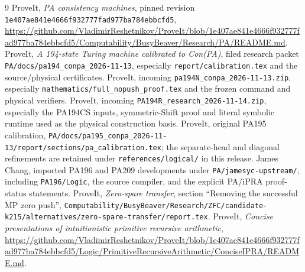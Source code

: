 \documentclass[11pt,letterpaper]{article}
\newcommand{\file}[1]{\texttt{\nolinkurl{#1}}}
\begin{document}
\clearpage
\begin{thebibliography}{9}
 ProveIt, \emph{PA consistency machines}, pinned revision
\nolinkurl{1e407ae841e4666f932777fad977ba784ebbcfd5},
\url{https://github.com/VladimirReshetnikov/ProveIt/blob/1e407ae841e4666f932777fad977ba784ebbcfd5/Computability/BusyBeaver/Research/PA/README.md}.
 ProveIt, \emph{A 194-state Turing machine calibrated to
Con(PA)}, filed research packet \file{PA/docs/pa194_conpa_2026-11-13},
especially \file{report/calibration.tex} and the source/physical certificates.
 ProveIt, incoming \file{pa194N_conpa_2026-11-13.zip},
especially \file{mathematics/full_nopush_proof.tex} and the frozen command
and physical verifiers.
 ProveIt, incoming \file{PA194R_research_2026-11-14.zip},
especially the PA194CS inputs, symmetric-Shift proof and literal symbolic
runtime used as the physical construction basis.
 ProveIt, original PA195 calibration,
\file{PA/docs/pa195_conpa_2026-11-13/report/sections/pa_calibration.tex};
the separate-head and diagonal refinements are retained under
\file{references/logical/} in this release.
 James Chang, imported PA196 and PA209 developments under
\file{PA/jamesyc-upstream/}, including \file{PA196/Logic}, the source
compiler, and the explicit PA/iPRA proof-status statements.
 ProveIt, \emph{Zero-spare transfer}, section ``Removing the
successful MP zero push'',
\file{Computability/BusyBeaver/Research/ZFC/candidate-k215/alternatives/zero-spare-transfer/report.tex}.
 ProveIt, \emph{Concise presentations of intuitionistic
primitive recursive arithmetic},
\url{https://github.com/VladimirReshetnikov/ProveIt/blob/1e407ae841e4666f932777fad977ba784ebbcfd5/Logic/PrimitiveRecursiveArithmetic/ConciseIPRA/README.md}.
\end{thebibliography}
\end{document}
